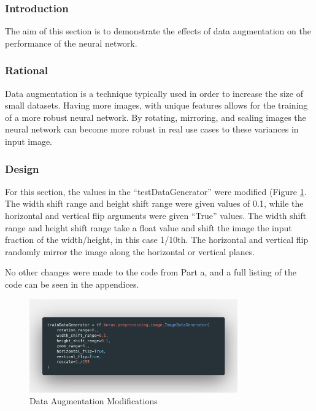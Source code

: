\subsubsection{Introduction}

The aim of this section is to demonstrate the effects of data augmentation on
the performance of the neural network.

\subsubsection{Rational}

Data augmentation is a technique typically used in order to increase the size of
small datasets. Having more images, with unique features allows for the training
of a more robust neural network. By rotating, mirroring, and scaling images the
neural network can become more robust in real use cases to these variances in
input image.

\subsubsection{Design}

For this section, the values in the ``testDataGenerator'' were modified (Figure
\ref{fig:images-Code-dataaug}. The
width shift range and height shift range were given values of 0.1, while the
horizontal and vertical flip arguments were given ``True'' values. The width
shift range and height shift range take a float value and shift the image the
input fraction of the width/height, in this case 1/10th. The horizontal and
vertical flip randomly mirror the image along the horizontal or vertical planes.

No other changes were made to the code from Part a, and a full listing of the
code can be seen in the appendices.

\begin{figure}[H]
	\centering
	\includegraphics[width=0.8\textwidth]{images/Code/dataaug}
	\caption{Data Augmentation Modifications}
	\label{fig:images-Code-dataaug}
\end{figure}

